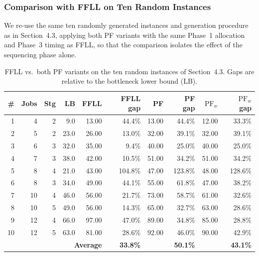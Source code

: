\documentclass[11pt,a4paper]{article}
\begin{document}
\subsubsection*{Comparison with FFLL on Ten Random Instances}

We re-use the same ten randomly generated instances and generation
procedure as in Section~4.3, applying both PF variants with the same
Phase~1 allocation and Phase~3 timing as FFLL, so that the comparison
isolates the effect of the sequencing phase alone.

\begin{table}[h!]
\centering
\small
\begin{tabular}{@{}rrrrrrrrrr@{}}
\toprule
\# & Jobs & Stg & LB & FFLL & FFLL gap & PF & PF gap & $\mathrm{PF}_w$ & $\mathrm{PF}_w$ gap \\
\midrule
1  & 4  & 2 & 9.0  & 13.00 & 44.4\%  & 13.00 & 44.4\%  & 12.00 & 33.3\%  \\
2  & 5  & 2 & 23.0 & 26.00 & 13.0\%  & 32.00 & 39.1\%  & 32.00 & 39.1\%  \\
3  & 6  & 3 & 32.0 & 35.00 & 9.4\%   & 40.00 & 25.0\%  & 40.00 & 25.0\%  \\
4  & 7  & 3 & 38.0 & 42.00 & 10.5\%  & 51.00 & 34.2\%  & 51.00 & 34.2\%  \\
5  & 8  & 4 & 21.0 & 43.00 & 104.8\% & 47.00 & 123.8\% & 48.00 & 128.6\% \\
6  & 8  & 3 & 34.0 & 49.00 & 44.1\%  & 55.00 & 61.8\%  & 47.00 & 38.2\%  \\
7  & 10 & 4 & 46.0 & 56.00 & 21.7\%  & 73.00 & 58.7\%  & 61.00 & 32.6\%  \\
8  & 10 & 5 & 49.0 & 56.00 & 14.3\%  & 65.00 & 32.7\%  & 63.00 & 28.6\%  \\
9  & 12 & 4 & 66.0 & 97.00 & 47.0\%  & 89.00 & 34.8\%  & 85.00 & 28.8\%  \\
10 & 12 & 5 & 63.0 & 81.00 & 28.6\%  & 92.00 & 46.0\%  & 90.00 & 42.9\%  \\
\midrule
\multicolumn{5}{r}{\textbf{Average}} & \textbf{33.8\%} & & \textbf{50.1\%} & & \textbf{43.1\%} \\
\bottomrule
\end{tabular}
\caption{FFLL vs.\ both PF variants on the ten random instances of
  Section~4.3. Gaps are relative to the bottleneck lower bound (LB).}
\label{tab:pf-random}
\end{table}
\end{document}
